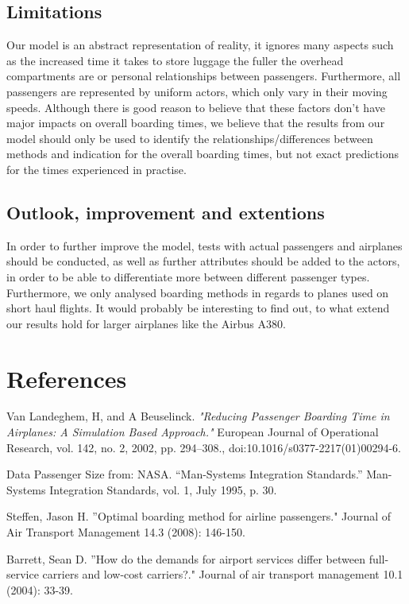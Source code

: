 \documentclass[11pt]{article}
\begin{document}
\subsection{Limitations}
Our model is an abstract representation of reality, it ignores many aspects such as the increased time it takes to store luggage the fuller the overhead compartments are or personal relationships between passengers. Furthermore, all passengers are represented by uniform actors, which only vary in their moving speeds. Although there is good reason to believe that these factors don't have major impacts on overall boarding times, we believe that the results from our model should only be used to identify the relationships/differences between methods and indication for the overall boarding times, but not exact predictions for the times experienced in practise.

\subsection{Outlook, improvement and extentions}
In order to further improve the model, tests with actual passengers and airplanes should be conducted, as well as further attributes should be added to the actors, in order to be able to differentiate more between different passenger types. Furthermore, we only analysed boarding methods in regards to planes used on short haul flights. It would probably be interesting to find out, to what extend our results hold for larger airplanes like the Airbus A380. 


\section{References}
\begin{thebibliography}{9}
	Van Landeghem, H, and A Beuselinck. 
	\textit{"Reducing Passenger Boarding Time in Airplanes: A Simulation Based Approach."} 
	European Journal of Operational Research, vol. 142, no. 2, 2002, pp. 294–308.,
	doi:10.1016/s0377-2217(01)00294-6.
	
	Data Passenger Size from:  NASA. “Man-Systems Integration Standards.” Man-Systems Integration Standards, vol. 1, July 1995, p. 30.
	
	Steffen, Jason H. ''Optimal boarding method for airline passengers." Journal of Air Transport Management 14.3 (2008): 146-150.

 Barrett, Sean D. ''How do the demands for airport services differ between full-service carriers and low-cost carriers?." Journal of air transport management 10.1 (2004): 33-39.


\end{thebibliography}
\end{document}
